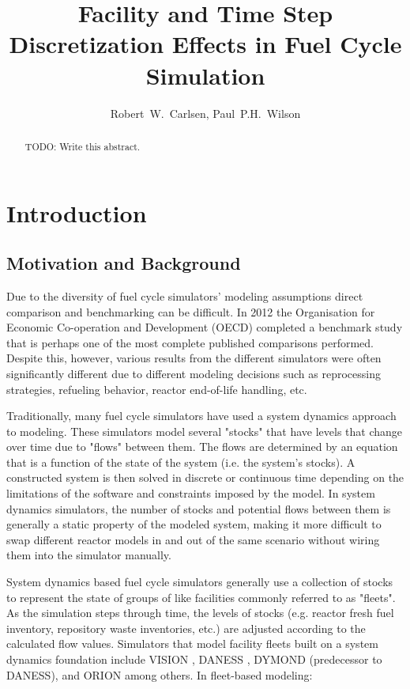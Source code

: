 \documentclass{style}
\title{Facility and Time Step Discretization Effects in Fuel Cycle Simulation}
\author{Robert~W.~Carlsen, Paul~P.H.~Wilson}
\institute{University of Wisconsin - Madison, Department of Nuclear Engineering and Engineering Physics, Madison, WI 53706}
\date{}
\begin{document}
\newpage
\begin{abstract}
TODO: Write this abstract.
\end{abstract}

\section{Introduction}

\subsection{Motivation and Background}

Due to the diversity of fuel cycle simulators' modeling assumptions direct
comparison and benchmarking can be difficult.  In 2012 the Organisation for
Economic Co-operation and Development (OECD) completed a benchmark study
\cite{oecd2012benchmark} that is perhaps one of the most complete published
comparisons performed.  Despite this, however, various results from the
different simulators were often significantly different due to different
modeling decisions such as reprocessing strategies, refueling behavior,
reactor end-of-life handling, etc.

Traditionally, many fuel cycle simulators have used a system dynamics approach
\cite{forrester_industrial_1961} to modeling. These simulators model several
"stocks" that have levels that change over time due to "flows" between them.
The flows are determined by an equation that is a function of the state of the
system (i.e. the system's stocks).  A constructed system is then solved
in discrete or continuous time depending on the limitations of the software
and constraints imposed by the model.  In system dynamics simulators, the
number of stocks and potential flows between them is generally a static
property of the modeled system, making it more difficult to swap different
reactor models in and out of the same scenario without wiring them into the
simulator manually.

System dynamics based fuel cycle simulators generally use a collection of
stocks to represent the state of groups of like facilities commonly referred
to as "fleets".  As the simulation steps through time, the levels of stocks
(e.g. reactor fresh fuel inventory, repository waste inventories, etc.) are
adjusted according to the calculated flow values.  Simulators that model
facility fleets built on a system dynamics foundation include VISION
\cite{jacobson_verifiable_2010}, DANESS \cite{van_den_durpel_daness_2009},
DYMOND (predecessor to DANESS), and ORION among others.  In fleet-based
modeling:
\end{document}
